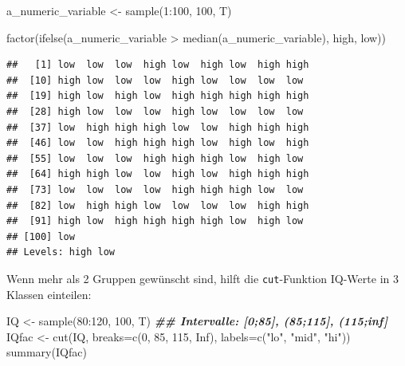 \documentclass[
]{book}
\newenvironment{Shaded}{\begin{snugshade}}{\end{snugshade}}
\newcommand{\AttributeTok}[1]{\textcolor[rgb]{0.77,0.63,0.00}{#1}}
\newcommand{\ConstantTok}[1]{\textcolor[rgb]{0.00,0.00,0.00}{#1}}
\newcommand{\DecValTok}[1]{\textcolor[rgb]{0.00,0.00,0.81}{#1}}
\newcommand{\DocumentationTok}[1]{\textcolor[rgb]{0.56,0.35,0.01}{\textbf{\textit{#1}}}}
\newcommand{\FunctionTok}[1]{\textcolor[rgb]{0.00,0.00,0.00}{#1}}
\newcommand{\NormalTok}[1]{#1}
\newcommand{\OtherTok}[1]{\textcolor[rgb]{0.56,0.35,0.01}{#1}}
\newcommand{\SpecialCharTok}[1]{\textcolor[rgb]{0.00,0.00,0.00}{#1}}
\newcommand{\StringTok}[1]{\textcolor[rgb]{0.31,0.60,0.02}{#1}}
\begin{document}
\begin{Shaded}
\begin{Highlighting}[]
\NormalTok{a\_numeric\_variable }\OtherTok{\textless{}{-}} \FunctionTok{sample}\NormalTok{(}\DecValTok{1}\SpecialCharTok{:}\DecValTok{100}\NormalTok{, }\DecValTok{100}\NormalTok{, T)}


\FunctionTok{factor}\NormalTok{(}\FunctionTok{ifelse}\NormalTok{(a\_numeric\_variable }\SpecialCharTok{\textgreater{}} \FunctionTok{median}\NormalTok{(a\_numeric\_variable),}
              \StringTok{\textquotesingle{}high\textquotesingle{}}\NormalTok{,}
              \StringTok{\textquotesingle{}low\textquotesingle{}}\NormalTok{))}
\end{Highlighting}
\end{Shaded}

\begin{verbatim}
##   [1] low  low  low  high low  high low  high high
##  [10] high low  low  low  high low  low  low  low 
##  [19] high low  high low  high high high high high
##  [28] high low  low  low  high low  low  low  low 
##  [37] low  high high high low  low  high high high
##  [46] low  low  high high high low  high low  high
##  [55] low  low  low  high high high low  high low 
##  [64] high high low  low  high low  high high high
##  [73] low  low  low  low  high high high low  low 
##  [82] low  high high low  low  low  low  high high
##  [91] high low  high high high high low  high low 
## [100] low 
## Levels: high low
\end{verbatim}

Wenn mehr als 2 Gruppen gewünscht sind, hilft die \texttt{cut}-Funktion
IQ-Werte in 3 Klassen einteilen:

\begin{Shaded}
\begin{Highlighting}[]
\NormalTok{IQ }\OtherTok{\textless{}{-}} \FunctionTok{sample}\NormalTok{(}\DecValTok{80}\SpecialCharTok{:}\DecValTok{120}\NormalTok{, }\DecValTok{100}\NormalTok{, T)}
\DocumentationTok{\#\# Intervalle: [0;85], (85;115], (115;inf]}
\NormalTok{IQfac }\OtherTok{\textless{}{-}} \FunctionTok{cut}\NormalTok{(IQ, }\AttributeTok{breaks=}\FunctionTok{c}\NormalTok{(}\DecValTok{0}\NormalTok{, }\DecValTok{85}\NormalTok{, }\DecValTok{115}\NormalTok{, }\ConstantTok{Inf}\NormalTok{), }
             \AttributeTok{labels=}\FunctionTok{c}\NormalTok{(}\StringTok{"lo"}\NormalTok{, }\StringTok{"mid"}\NormalTok{, }\StringTok{"hi"}\NormalTok{))}
\FunctionTok{summary}\NormalTok{(IQfac)}
\end{Highlighting}
\end{Shaded}
\end{document}
